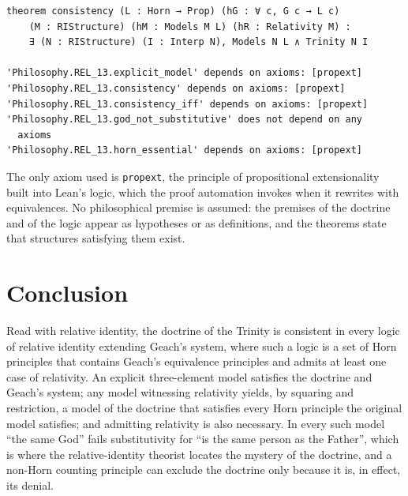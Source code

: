 \documentclass{situationist-preprint}
\begin{document}
\begin{lstlisting}
theorem consistency (L : Horn → Prop) (hG : ∀ c, G c → L c)
    (M : RIStructure) (hM : Models M L) (hR : Relativity M) :
    ∃ (N : RIStructure) (I : Interp N), Models N L ∧ Trinity N I

'Philosophy.REL_13.explicit_model' depends on axioms: [propext]
'Philosophy.REL_13.consistency' depends on axioms: [propext]
'Philosophy.REL_13.consistency_iff' depends on axioms: [propext]
'Philosophy.REL_13.god_not_substitutive' does not depend on any
  axioms
'Philosophy.REL_13.horn_essential' depends on axioms: [propext]
\end{lstlisting}

The only axiom used is \texttt{propext}, the principle of propositional extensionality built into Lean's logic, which the proof automation invokes when it rewrites with equivalences. No philosophical premise is assumed: the premises of the doctrine and of the logic appear as hypotheses or as definitions, and the theorems state that structures satisfying them exist.

\section{Conclusion}

Read with relative identity, the doctrine of the Trinity is consistent in every logic of relative identity extending Geach's system, where such a logic is a set of Horn principles that contains Geach's equivalence principles and admits at least one case of relativity. An explicit three-element model satisfies the doctrine and Geach's system; any model witnessing relativity yields, by squaring and restriction, a model of the doctrine that satisfies every Horn principle the original model satisfies; and admitting relativity is also necessary. In every such model \enquote{the same God} fails substitutivity for \enquote{is the same person as the Father}, which is where the relative-identity theorist locates the mystery of the doctrine, and a non-Horn counting principle can exclude the doctrine only because it is, in effect, its denial.
\end{document}
